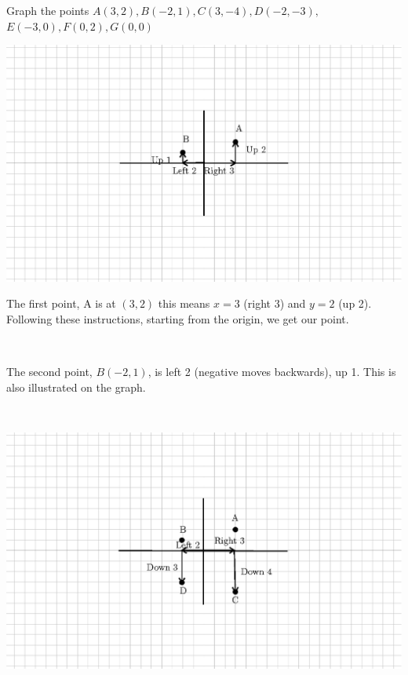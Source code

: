 \begin{example}\label{Lin43}
   Graph the points $A (3, 2), B (- 2, 1), C (3, - 4), D (- 2, - 3),$\\ $E (- 3,
  0), F (0, 2), G (0, 0)$
  
  \begin{multicols}{2}
    \includegraphics[scale=.9,bb = 115 65 310 190, clip=true]{II_1_3b-3.eps}
    
     The first point, A is at $(3, 2)$ this means $x = 3$ (right 3) and $y = 2$
    (up 2). Following these instructions, starting from the origin, we get our
    point.
    
    \
    
     The second point, $B (- 2, 1)$, is left 2 (negative moves backwards), up
    1. This is also illustrated on the graph. 
  \end{multicols}
  
  \
  
  \begin{multicols}{2}
    \includegraphics[scale=.9,bb = 115 65 310 190, clip=true]{II_1_3b-4.eps}
    

\end{multicols}
\end{example}
